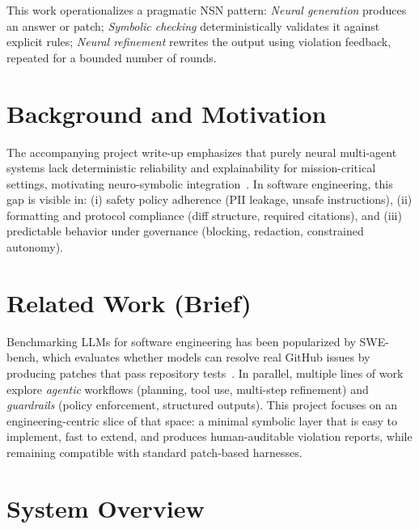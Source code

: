 \documentclass[conference]{IEEEtran}
\begin{document}
This work operationalizes a pragmatic NSN pattern: \emph{Neural generation} produces an answer or patch; \emph{Symbolic checking} deterministically validates it against explicit rules; \emph{Neural refinement} rewrites the output using violation feedback, repeated for a bounded number of rounds.

\section{Background and Motivation}
The accompanying project write-up emphasizes that purely neural multi-agent systems lack deterministic reliability and explainability for mission-critical settings, motivating neuro-symbolic integration~\cite{nsai_project_writeup}. In software engineering, this gap is visible in: (i) safety policy adherence (PII leakage, unsafe instructions), (ii) formatting and protocol compliance (diff structure, required citations), and (iii) predictable behavior under governance (blocking, redaction, constrained autonomy).

\section{Related Work (Brief)}
Benchmarking LLMs for software engineering has been popularized by SWE-bench, which evaluates whether models can resolve real GitHub issues by producing patches that pass repository tests~\cite{swebench}. In parallel, multiple lines of work explore \emph{agentic} workflows (planning, tool use, multi-step refinement) and \emph{guardrails} (policy enforcement, structured outputs). This project focuses on an engineering-centric slice of that space: a minimal symbolic layer that is easy to implement, fast to extend, and produces human-auditable violation reports, while remaining compatible with standard patch-based harnesses.

\section{System Overview}
\end{document}

